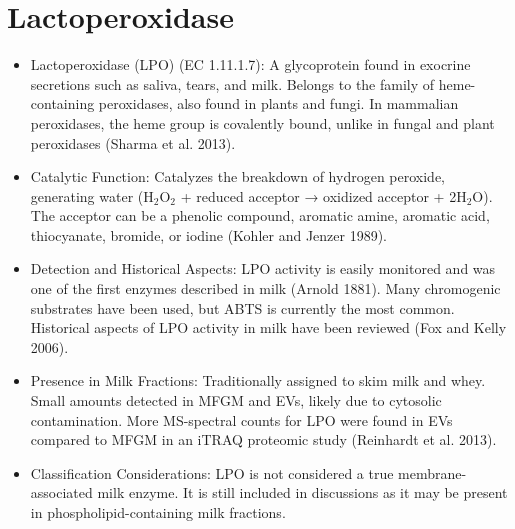 \section{Lactoperoxidase}
\begin{itemize}
    \item Lactoperoxidase (LPO) (EC 1.11.1.7):
    \subitem A glycoprotein found in exocrine secretions such as saliva, tears, and milk.
    \subitem Belongs to the family of heme-containing peroxidases, also found in plants and fungi.
    \subitem In mammalian peroxidases, the heme group is covalently bound, unlike in fungal and plant peroxidases (Sharma et al. 2013).

    \item Catalytic Function:
    \subitem Catalyzes the breakdown of hydrogen peroxide, generating water (H$_2$O$_2$ + reduced acceptor → oxidized acceptor + 2H$_2$O).
    \subitem The acceptor can be a phenolic compound, aromatic amine, aromatic acid, thiocyanate, bromide, or iodine (Kohler and Jenzer 1989).

    \item Detection and Historical Aspects:
    \subitem LPO activity is easily monitored and was one of the first enzymes described in milk (Arnold 1881).
    \subitem Many chromogenic substrates have been used, but ABTS is currently the most common.
    \subitem Historical aspects of LPO activity in milk have been reviewed (Fox and Kelly 2006).

    \item Presence in Milk Fractions:
    \subitem Traditionally assigned to skim milk and whey.
    \subitem Small amounts detected in MFGM and EVs, likely due to cytosolic contamination.
    \subitem More MS-spectral counts for LPO were found in EVs compared to MFGM in an iTRAQ proteomic study (Reinhardt et al. 2013).

    \item Classification Considerations:
    \subitem LPO is not considered a true membrane-associated milk enzyme.
    \subitem It is still included in discussions as it may be present in phospholipid-containing milk fractions.
\end{itemize}

